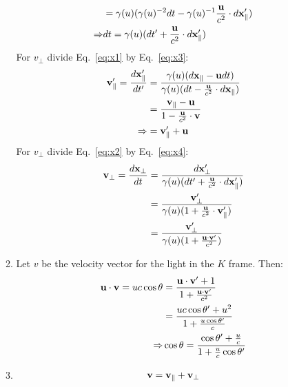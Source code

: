 \documentclass[12pt,a4]{article}
\begin{document}
\begin{enumerate}
\begin{enumerate}
\begin{align}
               &= \gamma(u) (\gamma(u)^{-2} dt - \gamma(u)^{-1}\frac{{\bf u}}{c^2} \cdot d {\bf x}'_\parallel)\nonumber\\
          \Rightarrow & dt = \gamma(u) (dt' + \frac{{\bf u}}{c^2} \cdot d {\bf x}'_\parallel) \label{eq:x4}
        \end{align}
        For $v_\perp$ divide Eq.~\ref{eq:x1} by Eq.~\ref{eq:x3}:
        \begin{align*}
          {\bf v}'_\parallel = \frac{d {\bf x}'_\parallel}{d t'}  &= \frac{\gamma (u) (d {\bf x}_\parallel - {\bf u} dt)}{\gamma (u) (d t - \frac{\bf u}{c^2}\cdot d{\bf x}_\parallel)}\\
                                                                  &= \frac{{\bf v}_\parallel - {\bf u} }{1 - \frac{\bf u}{c^2} \cdot {\bf v}}\\
                                                      \Rightarrow &= {\bf v}'_\parallel + {\bf u}
        \end{align*}
        For $v_\perp$ divide Eq.~\ref{eq:x2} by Eq.~\ref{eq:x4}:
        \begin{align*}
          {\bf v}_\perp = \frac{d {\bf x}_\perp}{d t} &= \frac{d {\bf x}'_\perp}{\gamma(u) (dt' + \frac{{\bf u}}{c^2} \cdot d {\bf x}'_\parallel)}\\
                                                      &= \frac{{\bf v}'_\perp}{\gamma (u) (1 + \frac{{\bf u}}{c^2}\cdot {\bf v}'_\parallel)}\\
                                                      &= \frac{{\bf v}'_\perp}{\gamma (u) (1 + \frac{{\bf u}\cdot {\bf v}'}{c^2})}
        \end{align*}
      \item 
        Let $v$ be the velocity vector for the light in the $K$ frame. Then:
        \begin{align*}
          {\bf u} \cdot {\bf v} = u c \cos \theta & = \frac{{\bf u} \cdot {\bf v'} + 1}{1 + \frac{{\bf u} \cdot {\bf v'}}{c^2}}\\
                                                  & = \frac{uc \cos \theta ' + u^2}{1 + \frac{u \cos \theta '}{c}}\\
                                      \Rightarrow &\cos\theta = \frac{\cos \theta '+\frac{u}{c}}{1 + \frac{u}{c} \cos\theta ' }
        \end{align*}
      \item
        \begin{align*}
          {\bf v} &= {\bf v}_\parallel + {\bf v}_\perp\\

\end{align*}
\end{enumerate}
\end{enumerate}
\end{document}
